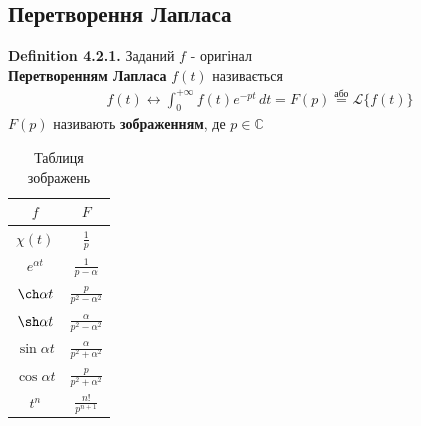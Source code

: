 \documentclass[a4paper, 10pt]{article}
\def\hugespace{\vspace{5mm} \\}
\theoremstyle{theoremdd}
\theoremstyle{theoremdd}
\theoremstyle{theoremdd}
\theoremstyle{theoremdd}
\theoremstyle{theoremdd}
\theoremstyle{theoremdd}
\theoremstyle{theoremdd}
\theoremstyle{theoremdd}
\begin{document}
\subsection{Перетворення Лапласа}
\textbf{Definition 4.2.1.} Заданий $f$ - оригінал\\
\textbf{Перетворенням Лапласа} $f(t)$ називається
\begin{align*}
f(t) \leftrightarrow \int_0^{+\infty} f(t)e^{-pt}\,dt = F(p) \overset{\textrm{або}}{=} \mathscr{L}\{f(t)\}
\end{align*}
$F(p)$ називають \textbf{зображенням}, де $p \in \mathbb{C}$
\hugespace
\begin{table}[h!]
\begin{center}
\begin{tabular}{ c|c }
 $f$ & $F$ \\
 \hline
 $\chi(t)$ & $\displaystyle \frac{1}{p}$ \\
 \hline
 $e^{\alpha t}$ & $\displaystyle \frac{1}{p- \alpha}$\\
 \hline
 $\ch \alpha t$ & $\displaystyle \frac{p}{p^2-\alpha^2}$\\
 \hline
 $\sh \alpha t$ & $\displaystyle \frac{\alpha}{p^2-\alpha^2}$\\
 \hline
 $\sin \alpha t$ & $\displaystyle \frac{\alpha}{p^2 + \alpha^2}$\\
 \hline
 $\cos \alpha t$ & $\displaystyle \frac{p}{p^2 + \alpha^2}$\\
 \hline
 $t^n$ & $\displaystyle \frac{n!}{p^{n+1}}$ \\
\end{tabular}
	    \caption{Таблиця зображень}
    		\label{tab:table1}
\end{center}
\end{table}
\end{document}
